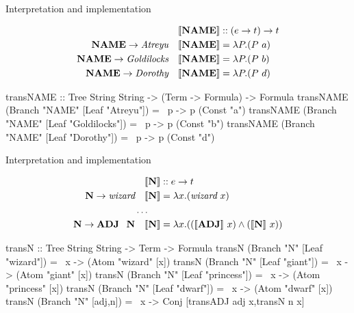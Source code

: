 \documentclass[xcolor=dvipsnames]{beamer}
\newcommand{\sem}[1]{\ensuremath{[\hspace{-1.8pt}[ #1 ]\hspace{-1.8pt}]}}
\begin{document}
\begin{frame}[fragile]{Interpretation and implementation}

\begin{align*}
&\quad \sem{\textbf{NAME}} :: (e\to t)\to t \\
\textbf{NAME} \to \text{\em Atreyu} &\quad \sem{\textbf{NAME}} = \lambda P.(P\ a) \\
\textbf{NAME} \to \text{\em Goldilocks} &\quad \sem{\textbf{NAME}} = \lambda P.(P\ b) \\
\textbf{NAME} \to \text{\em Dorothy} &\quad \sem{\textbf{NAME}} = \lambda P.(P\ d) \\
\end{align*}
\begin{code}
transNAME :: Tree String String -> (Term -> Formula) 
                                -> Formula 
transNAME (Branch "NAME" [Leaf "Atreyu"]) = 
                                        \ p -> p (Const "a") 
transNAME (Branch "NAME" [Leaf "Goldilocks"]) = 
                                        \ p -> p (Const "b") 
transNAME (Branch "NAME" [Leaf "Dorothy"]) = 
                                        \ p -> p (Const "d")
\end{code}
\end{frame}


\begin{frame}[fragile]{Interpretation and implementation}

\begin{align*}
&\quad \sem{\textbf{N}} :: e\to t \\
\textbf{N} \to \text{\em wizard} &\quad \sem{\textbf{N}} = \lambda x.(\text{\em wizard}\ x) \\
& \ldots \\
\textbf{N} \to \textbf{ADJ\ \ N} &\quad \sem{\textbf{N}} = \lambda x.((\sem{\textbf{ADJ}}\ x)\land (\sem{\textbf{N}}\ x))
\end{align*}
\begin{code}
transN :: Tree String String -> Term -> Formula
transN (Branch "N" [Leaf "wizard"]) = 
                                \ x -> (Atom "wizard" [x])
transN (Branch "N" [Leaf "giant"]) = 
                                \ x -> (Atom "giant" [x])
transN (Branch "N" [Leaf "princess"]) = 
                                \ x -> (Atom "princess" [x])
transN (Branch "N" [Leaf "dwarf"]) = 
                                \ x -> (Atom "dwarf" [x])
transN (Branch "N" [adj,n]) = 
                     \ x -> Conj [transADJ adj x,transN n x]
\end{code}
\end{frame}
\end{document}
